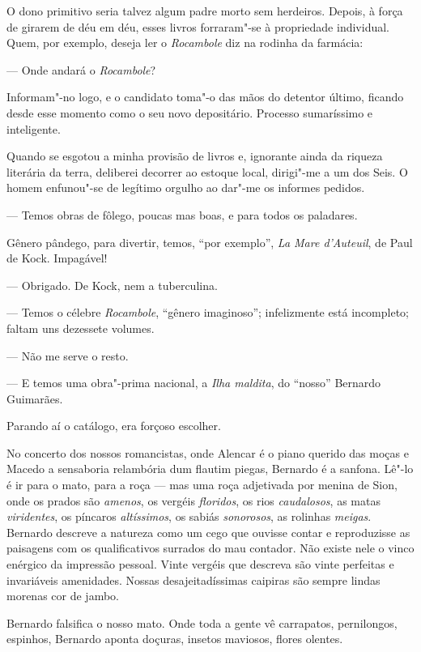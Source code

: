O dono primitivo seria talvez algum padre morto sem herdeiros. Depois, à
força de girarem de déu em déu, esses livros forraram"-se à propriedade
individual. Quem, por exemplo, deseja ler o \emph{Rocambole} diz na
rodinha da farmácia:

--- Onde andará o \emph{Rocambole}?

Informam"-no logo, e o candidato toma"-o das mãos do detentor último,
ficando desde esse momento como o seu novo depositário. Processo
sumaríssimo e inteligente.

Quando se esgotou a minha provisão de livros e, ignorante ainda da
riqueza literária da terra, deliberei decorrer ao estoque local,
dirigi"-me a um dos Seis. O homem enfunou"-se de legítimo orgulho ao
dar"-me os informes pedidos.

--- Temos obras de fôlego, poucas mas boas, e para todos os paladares.

Gênero pândego, para divertir, temos, ``por exemplo'', \emph{La Mare
d'Auteuil}, de Paul de Kock. Impagável!

--- Obrigado. De Kock, nem a tuberculina.

--- Temos o célebre \emph{Rocambole}, ``gênero imaginoso''; infelizmente
está incompleto; faltam uns dezessete volumes.

--- Não me serve o resto.

--- E temos uma obra"-prima nacional, a \emph{Ilha maldita}, do ``nosso''
Bernardo Guimarães.

Parando aí o catálogo, era forçoso escolher.

No concerto dos nossos romancistas, onde Alencar é o piano querido das
moças e Macedo a sensaboria relambória dum flautim piegas, Bernardo é a
sanfona. Lê"-lo é ir para o mato, para a roça --- mas uma roça adjetivada
por menina de Sion, onde os prados são \emph{amenos}, os vergéis
\emph{floridos}, os rios \emph{caudalosos}, as matas \emph{viridentes},
os píncaros \emph{altíssimos}, os sabiás \emph{sonorosos}, as rolinhas
\emph{meigas}. Bernardo descreve a natureza como um cego que ouvisse
contar e reproduzisse as paisagens com os qualificativos surrados do mau
contador. Não existe nele o vinco enérgico da impressão pessoal. Vinte
vergéis que descreva são vinte perfeitas e invariáveis amenidades.
Nossas desajeitadíssimas caipiras são sempre lindas morenas cor de
jambo.

Bernardo falsifica o nosso mato. Onde toda a gente vê carrapatos,
pernilongos, espinhos, Bernardo aponta doçuras, insetos maviosos, flores
olentes.


